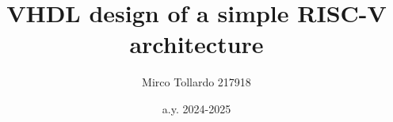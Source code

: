\usepackage[a4paper, left=1in, right=1in, bottom=1in, top=0.75in]{geometry}
\usepackage[utf8]{inputenc} %
\usepackage[T1]{fontenc}
\usepackage{amssymb}
\usepackage{newtxtext}
\usepackage{multicol}
\usepackage[newfloat]{minted}
\usepackage{graphicx}
\usepackage[italicdiff]{physics}
\usepackage{float}
\usepackage{amsmath}
\usepackage{titlepic}
\usepackage{titlesec}
\usepackage{hyperref}
\usepackage{pgfplots}
\usepackage{multirow}
\usepackage{caption}

\newenvironment{code}{\captionsetup{type=listing}}{}

\pgfplotsset{compat=1.18}

\graphicspath{{images/}}
\setcounter{secnumdepth}{0}

\titleformat{\chapter}[display]
  {\normalfont\bfseries}{}{0pt}{\Huge}
  
\title{VHDL design of a simple RISC-V architecture}
\author{Mirco Tollardo 217918}
\date{a.y. 2024-2025}

